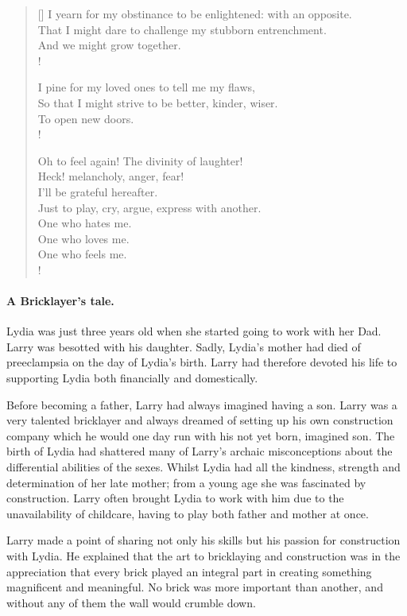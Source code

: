 \begin{verse}[\versewidth]
I yearn for my obstinance to be enlightened: with an opposite.\\
That I might dare to challenge my stubborn entrenchment.\\
And we might grow together.\\!

I pine for my loved ones to tell me my flaws,\\
So that I might strive to be better, kinder, wiser.\\
To open new doors.\\!

Oh to feel again! The divinity of laughter!\\
Heck! melancholy, anger, fear!\\
I’ll be grateful hereafter.\\
Just to play, cry, argue, express with another.\\
One who hates me.\\
One who loves me.\\
One who feels me.\\!

\end{verse}

\fugue

\paragraph{A Bricklayer’s tale.}\strut

Lydia was just three years old when she started going to work with her
Dad. Larry was besotted with his daughter. Sadly, Lydia's mother had
died of preeclampsia on the day of Lydia's birth. Larry had therefore
devoted his life to supporting Lydia both financially and
domestically.

Before becoming a father, Larry had always imagined having a
son. Larry was a very talented bricklayer and always dreamed of
setting up his own construction company which he would one day run
with his not yet born, imagined son. The birth of Lydia had shattered
many of Larry's archaic misconceptions about the differential
abilities of the sexes. Whilst Lydia had all the kindness, strength
and determination of her late mother; from a young age she was
fascinated by construction. Larry often brought Lydia to work with him
due to the unavailability of childcare, having to play both father and
mother at once.

Larry made a point of sharing not only his skills but his passion for
construction with Lydia. He explained that the art to bricklaying and
construction was in the appreciation that every brick played an
integral part in creating something magnificent and meaningful. No
brick was more important than another, and without any of them the
wall would crumble down.

